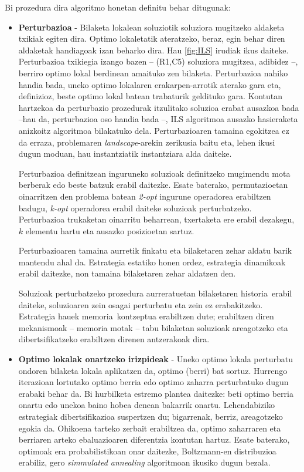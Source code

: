 \documentclass[eu]{ifirak}\usepackage[]{graphicx}\usepackage[]{color}
\newcommand{\zkk}{\guillemotleft}
\newcommand{\skk}{\guillemotright}
\begin{document}
Bi prozedura dira algoritmo honetan definitu behar ditugunak:

\begin{itemize}
\item \textbf{Perturbazioa} - Bilaketa lokalean soluziotik soluziora mugitzeko aldaketa txikiak egiten dira. Optimo lokaletatik ateratzeko, beraz, egin behar diren aldaketak handiagoak izan beharko dira. Hau \ref{fig:ILS} irudiak ikus daiteke. Perturbazioa txikiegia izango bazen -- (R1,C5) soluziora mugitzea, adibidez --, berriro optimo lokal berdinean amaituko zen bilaketa. Perturbazioa nahiko handia bada, uneko optimo lokalaren erakarpen-arrotik aterako gara eta, definizioz, beste optimo lokal batean trabaturik geldituko gara. Kontutan hartzekoa da perturbazio prozedurak itzulitako soluzioa erabat ausazkoa bada --hau da, perturbazioa oso handia bada --, ILS algoritmoa ausazko hasieraketa anizkoitz algoritmoa bilakatuko dela. Perturbazioaren tamaina egokitzea ez da erraza, problemaren \textit{landscape}-arekin zerikusia baitu eta, lehen ikusi dugun moduan, hau instantziatik instantziara alda daiteke.

Perturbazioa definitzean inguruneko soluzioak definitzeko mugimendu mota berberak edo beste batzuk erabil daitezke. Esate baterako, permutazioetan oinarritzen den problema batean \textit{2-opt} ingurune operadorea erabiltzen badugu, \textit{k-opt} operadorea erabil daiteke soluzioak perturbatzeko. Perturbazioa trukaketan oinarritu beharrean, txertaketa ere erabil dezakegu, $k$ elementu hartu eta ausazko posizioetan sartuz. 

Perturbazioaren tamaina aurretik finkatu eta bilaketaren zehar aldatu barik mantendu ahal da. Estrategia estatiko honen ordez, estrategia dinamikoak erabil daitezke, non tamaina bilaketaren zehar aldatzen den.

Soluzioak perturbatzeko prozedura aurreratuetan bilaketaren \zkk historia\skk\ erabil daiteke, soluzioaren zein osagai perturbatu eta zein ez erabakitzeko. Estrategia hauek \zkk memoria\skk\ kontzeptua erabiltzen dute; erabiltzen diren mekanismoak -- memoria motak -- tabu bilaketan soluzioak areagotzeko eta dibertsifikatzeko erabiltzen direnen antzerakoak dira.

\item \textbf{Optimo lokalak onartzeko irizpideak} - Uneko optimo lokala perturbatu ondoren bilaketa lokala aplikatzen da, optimo (berri) bat sortuz. Hurrengo iterazioan lortutako optimo berria edo optimo zaharra perturbatuko dugun erabaki behar da. Bi hurbilketa estremo plantea daitezke: beti optimo berria onartu edo unekoa baino hobea denean bakarrik onartu. Lehendabiziko estrategiak dibertsifikazioa suspertzen du; bigarrenak, berriz, areagotzeko egokia da. Ohikoena tarteko zerbait erabiltzea da, optimo zaharraren eta berriaren arteko ebaluazioaren diferentzia kontutan hartuz. Esate baterako, optimoak era probabilistikoan onar daitezke, Boltzmann-en distribuzioa erabiliz, gero \textit{simmulated annealing} algoritmoan ikusiko dugun bezala. 
\end{itemize}
\end{document}
